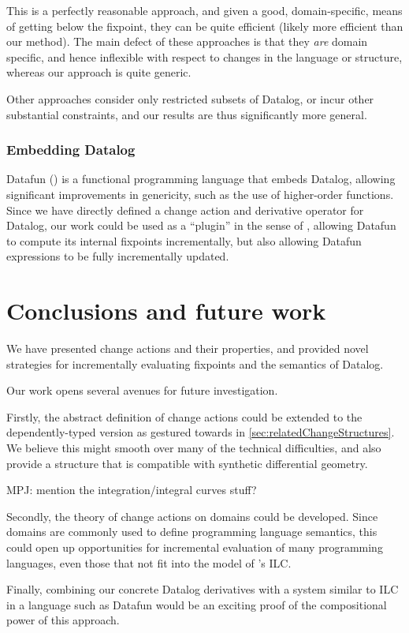 This is a perfectly reasonable approach, and given a good, domain-specific,
means of getting below the fixpoint, they can be quite efficient (likely more
efficient than our method). The main defect of these approaches is that they
\emph{are} domain specific, and hence inflexible with respect to changes in the
language or structure, whereas our approach is quite generic.

Other approaches \autocites{dong2000incremental}{urpi1992method} consider only
restricted subsets of Datalog, or incur other substantial constraints, and our results
are thus significantly more general.

\subsubsection{Embedding Datalog}
\label{sec:embeddingDatalog}

Datafun (\textcite{arntz2016datafun}) is a functional programming language that embeds
Datalog, allowing significant improvements in genericity, such as the use of
higher-order functions. Since we have directly defined a change action and
derivative operator for Datalog, our work could be used as a ``plugin'' in the sense
of \citeauthor{cai2014changes}, allowing Datafun to compute its internal fixpoints
incrementally, but also allowing Datafun expressions to be fully incrementally updated.

\section{Conclusions and future work}

We have presented change actions and their properties, and provided novel
strategies for incrementally evaluating fixpoints and the semantics of Datalog.

Our work opens several avenues for future investigation.

Firstly, the abstract definition of change actions could be extended to the
dependently-typed version as gestured towards in
\cref{sec:relatedChangeStructures}. We believe this might smooth over many of
the technical difficulties, and also provide a structure that is compatible with
synthetic differential geometry.

MPJ: mention the integration/integral curves stuff?

Secondly, the theory of change actions on domains could be developed. Since
domains are commonly used to define programming language semantics, this could
open up opportunities for incremental evaluation of many programming languages,
even those that not fit into the model of \citeauthor{cai2014changes}'s ILC.

Finally, combining our concrete Datalog derivatives with a system similar to ILC
in a language such as Datafun would be an exciting proof of the compositional
power of this approach.

\printbibliography


